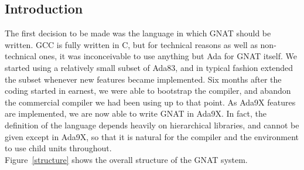 \subsection{Introduction}
The first decision to be made was the language in which GNAT should be
written. GCC is fully written in C, but for technical reasons as well
as non-technical ones,  it was inconceivable to use anything but Ada for GNAT
itself. We started using a relatively small subset of Ada83, and in typical
fashion extended the subset whenever new features became implemented. Six
months after the coding started in earnest,  we were able to bootstrap the
compiler, and abandon the commercial compiler we had been using up to that
point. As Ada9X features are implemented,  we are now able to write GNAT
in Ada9X. In fact, the definition of the language depends heavily on 
hierarchical libraries, and cannot be given except in Ada9X, so that it is
natural for the compiler and the environment to use child units throughout.
\\ 
Figure~\ref{structure} shows the overall structure of the GNAT system.
%
